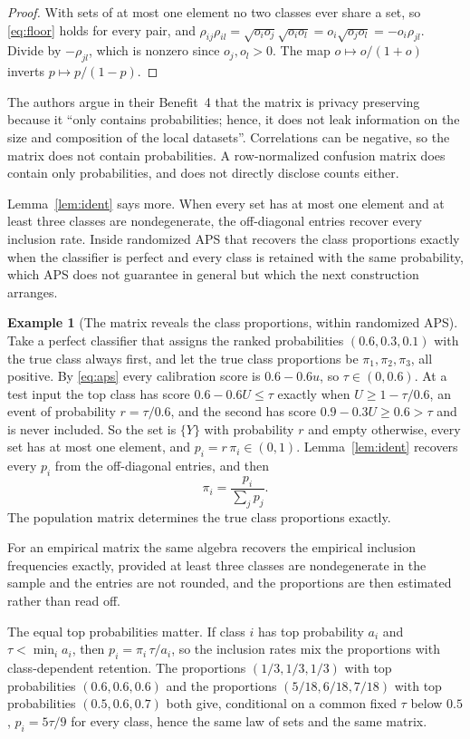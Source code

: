 \documentclass[11pt]{article}
\theoremstyle{definition}
\newtheorem{example}{Example}
\theoremstyle{definition}
\theoremstyle{remark}
\newcommand{\set}[1]{\{#1\}}
\begin{document}
\begin{proof}
With sets of at most one element no two classes ever share a set, so \eqref{eq:floor} holds for
every pair, and
$\rho_{ij}\rho_{il} = \sqrt{o_i o_j}\sqrt{o_i o_l} = o_i \sqrt{o_j o_l} = -o_i \rho_{jl}$. Divide by
$-\rho_{jl}$, which is nonzero since $o_j, o_l > 0$. The map $o \mapsto o/(1+o)$ inverts
$p \mapsto p/(1-p)$.
\end{proof}

The authors argue in their Benefit~4 that the matrix is privacy preserving because it ``only contains
probabilities; hence, it does not leak information on the size and composition of the local
datasets''. Correlations
can be negative, so the matrix does not contain probabilities. A row-normalized confusion matrix
does contain only probabilities, and does not directly disclose counts either.

Lemma~\ref{lem:ident} says more. When every set has at most one element and at least three classes
are nondegenerate, the off-diagonal entries recover every inclusion rate. Inside randomized APS that recovers the class proportions exactly when the classifier is perfect and
every class is retained with the same probability, which APS does not guarantee in general but
which the next construction arranges.

\begin{example}[The matrix reveals the class proportions, within randomized APS]\label{ex:privacy}
Take a perfect classifier that assigns the ranked probabilities $(0.6, 0.3, 0.1)$ with the true
class always first, and let the true class proportions be $\pi_1, \pi_2, \pi_3$, all positive. By
\eqref{eq:aps} every calibration score is $0.6 - 0.6u$, so $\tau \in (0, 0.6)$. At a test input the
top class has score $0.6 - 0.6U \le \tau$ exactly when $U \ge 1 - \tau/0.6$, an event of
probability $r = \tau/0.6$, and the second has score $0.9 - 0.3U \ge 0.6 > \tau$ and is never included. So the set is $\set{Y}$ with probability $r$ and empty otherwise, every set has at most
one element, and $p_i = r\,\pi_i \in (0, 1)$. Lemma~\ref{lem:ident} recovers every $p_i$ from the
off-diagonal entries, and then
\[
\pi_i = \frac{p_i}{\sum_j p_j} .
\]
The population matrix determines the true class proportions exactly.

For an empirical matrix the same algebra recovers the empirical inclusion frequencies exactly,
provided at least three classes are nondegenerate in the sample and the entries are not rounded,
and the proportions are then estimated rather than read off.

The equal top probabilities matter. If class $i$ has top probability $a_i$ and $\tau < \min_i a_i$,
then $p_i = \pi_i\, \tau / a_i$, so the inclusion rates mix the proportions with class-dependent
retention. The proportions $(1/3, 1/3, 1/3)$ with top probabilities $(0.6, 0.6, 0.6)$ and the
proportions $(5/18, 6/18, 7/18)$ with top probabilities $(0.5, 0.6, 0.7)$ both give, conditional on a common fixed $\tau$ below $0.5$, $p_i = 5\tau/9$ for every class, hence the same law of sets and the same matrix.
\end{example}
\end{document}
